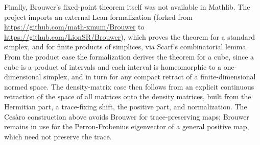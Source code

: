 Finally, Brouwer's fixed-point theorem itself was not available in Mathlib. The project imports an external Lean formalization (forked from \url{https://github.com/math-xmum/Brouwer} to \url{https://github.com/LionSR/Brouwer}), which proves the theorem for a standard simplex, and for finite products of simplices, via Scarf's combinatorial lemma. From the product case the formalization derives the theorem for a cube, since a cube is a product of intervals and each interval is homeomorphic to a one-dimensional simplex, and in turn for any compact retract of a finite-dimensional normed space. The density-matrix case then follows from an explicit continuous retraction of the space of all matrices onto the density matrices, built from the Hermitian part, a trace-fixing shift, the positive part, and normalization. The Ces\`aro construction above avoids Brouwer for trace-preserving maps; Brouwer remains in use for the Perron-Frobenius eigenvector of a general positive map, which need not preserve the trace.




\clearpage


\clearpage

